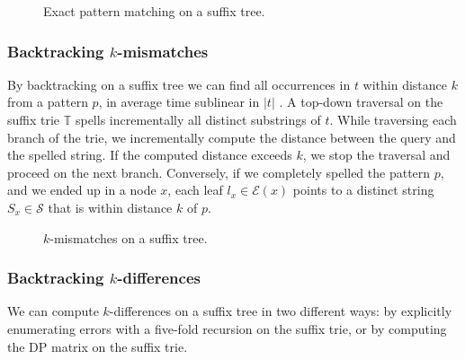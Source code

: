 \begin{figure}[h]
\caption{Exact pattern matching on a suffix tree.}
\label{fig:st-exact}
\end{figure}

\subsubsection{Backtracking $k$-mismatches}

By backtracking \citep{Ukkonen1993, Baeza1999} on a suffix tree we can find all occurrences in $t$ within distance $k$ from a pattern $p$, in average time sublinear in $|t|$ \citep{Navarro2000}.
A top-down traversal on the suffix trie $\mathbb{T}$ spells incrementally all distinct substrings of $t$.
While traversing each branch of the trie, we incrementally compute the distance between the query and the spelled string.
If the computed distance exceeds $k$, we stop the traversal and proceed on the next branch.
Conversely, if we completely spelled the pattern $p$, and we ended up in a node $x$, each leaf $l_x \in \mathcal{E}(x)$ points to a distinct string $S_x \in \mathcal{S}$ that is within distance $k$ of $p$.


\begin{figure}[h]
\caption{$k$-mismatches on a suffix tree.}
\label{fig:st-hamming}
\end{figure}

\subsubsection{Backtracking $k$-differences}

We can compute $k$-differences on a suffix tree in two different ways: by explicitly enumerating errors with a five-fold recursion on the suffix trie, or by computing the DP matrix on the suffix trie.


